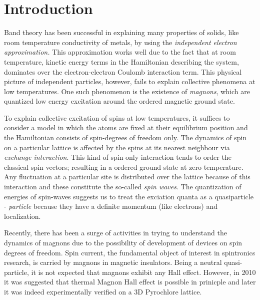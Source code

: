 \chapter{\label{intro}Introduction}
Band theory has been successful in explaining many properties of solids, like room temperature conductivity of metals, by using the \textit{independent electron approximation.} This approximation works well due to the fact that at room temperature, kinetic energy terms in the Hamiltonian describing the system, dominates over the electron-electron Coulomb interaction term. This physical picture of independent particles, however, fails to explain collective phenomena at low temperatures. One such phenomenon is the existence of \textit{magnons}, which are quantized low energy excitation around the ordered magnetic ground state.
 
To explain collective excitation of spins at low temperatures, it suffices to consider
a model in which the atoms are fixed at their equilibrium position and the Hamiltonian consists of spin-degrees of freedom only. The dynamics of spin on a particular lattice is affected by the spins at its nearest neighbour via \textit{exchange interaction}. This kind of spin-only interaction tends to order the classical spin vectors; resulting in a ordered ground state at zero temperature. Any fluctuation at a particular site is distributed over the lattice because of this interaction and these constitute the so-called \textit{spin waves}. The quantization of energies of spin-waves suggests us to treat the exciation quanta as a quasiparticle - \textit{particle} because they have a definite momentum (like electrons) and localization. 

Recently, there has been a surge of activities in trying to understand the dynamics of magnons due to the possibility of development of devices on spin degrees of freedom. Spin current, the fundamental object of interest in spintronics research, is carried by magnons in magnetic insulators. Being a neutral quasi-particle, it is not expected that magnons exhibit any Hall effect. However, in 2010 it was suggested\cite{PhysRevLett.104.066403} that thermal Magnon Hall effect is possible in prinicple and later it was indeed experimentally verified\cite{Onose297} on a 3D Pyrochlore lattice. 

